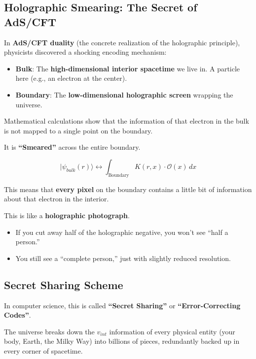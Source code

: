 \subsection{Holographic Smearing: The Secret of AdS/CFT}

In \textbf{AdS/CFT duality} (the concrete realization of the holographic principle), physicists discovered a shocking encoding mechanism:

\begin{itemize}
\item \textbf{Bulk}: The \textbf{high-dimensional interior spacetime} we live in. A particle here (e.g., an electron at the center).

\item \textbf{Boundary}: The \textbf{low-dimensional holographic screen} wrapping the universe.
\end{itemize}

Mathematical calculations show that the information of that electron in the bulk is not mapped to a single point on the boundary.

It is \textbf{``Smeared''} across the entire boundary.

\[|\psi_{bulk}(r)\rangle \longleftrightarrow \int_{\text{Boundary}} K(r, x) \cdot \mathcal{O}(x) \, dx\]

This means that \textbf{every pixel} on the boundary contains a little bit of information about that electron in the interior.

This is like a \textbf{holographic photograph}.

\begin{itemize}
\item If you cut away half of the holographic negative, you won't see ``half a person.''

\item You still see a ``complete person,'' just with slightly reduced resolution.
\end{itemize}

\subsection{Secret Sharing Scheme}

In computer science, this is called \textbf{``Secret Sharing''} or \textbf{``Error-Correcting Codes''}.

The universe breaks down the $v_{int}$ information of every physical entity (your body, Earth, the Milky Way) into billions of pieces, redundantly backed up in every corner of spacetime.


